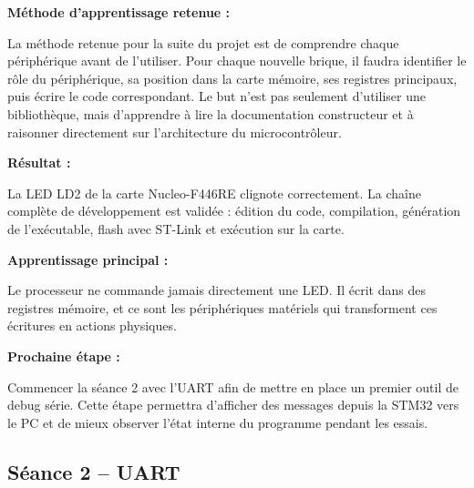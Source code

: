 \documentclass[11pt,a4paper]{article}
\begin{document}
\begin{sessionbox}
		\vspace{0.3cm}
		
		\textbf{Méthode d'apprentissage retenue :}
		
		La méthode retenue pour la suite du projet est de comprendre chaque périphérique avant de l'utiliser. Pour chaque nouvelle brique, il faudra identifier le rôle du périphérique, sa position dans la carte mémoire, ses registres principaux, puis écrire le code correspondant. Le but n'est pas seulement d'utiliser une bibliothèque, mais d'apprendre à lire la documentation constructeur et à raisonner directement sur l'architecture du microcontrôleur.
		
		\vspace{0.3cm}
		
		\textbf{Résultat :}
		
		La LED LD2 de la carte Nucleo-F446RE clignote correctement. La chaîne complète de développement est validée : édition du code, compilation, génération de l'exécutable, flash avec ST-Link et exécution sur la carte.
		
		\vspace{0.3cm}
		
		\textbf{Apprentissage principal :}
		
		Le processeur ne commande jamais directement une LED. Il écrit dans des registres mémoire, et ce sont les périphériques matériels qui transforment ces écritures en actions physiques.
		
		\vspace{0.3cm}
		
		\textbf{Prochaine étape :}
		
		Commencer la séance 2 avec l'UART afin de mettre en place un premier outil de debug série. Cette étape permettra d'afficher des messages depuis la STM32 vers le PC et de mieux observer l'état interne du programme pendant les essais.
		
	\end{sessionbox}
	
	
	\subsection*{Séance 2 -- UART}
	
\end{document}
